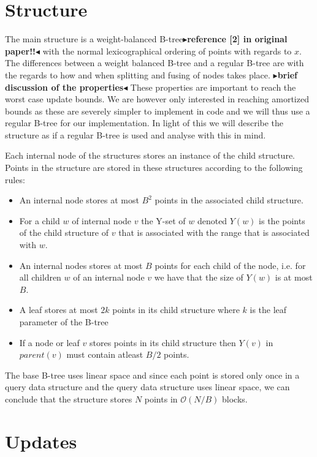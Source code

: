 \documentclass[twoside,11pt,openright]{report}
\newcommand{\todo}[1]{{\color[rgb]{.5,0,0}\textbf{$\blacktriangleright$#1$\blacktriangleleft$}}}
\begin{document}
\section{Structure}
The main structure is a weight-balanced B-tree\todo{reference [2] in original paper!!} with the normal lexicographical ordering of points with regards to $x$. The differences between a weight balanced B-tree and a regular B-tree are with the regards to how and when splitting and fusing of nodes takes place. \todo{brief discussion of the properties} These properties are important to reach the worst case update bounds. We are however only interested in reaching amortized bounds as these are severely simpler to implement in code and we will thus use a regular B-tree for our implementation. In light of this we will describe the structure as if a regular B-tree is used and analyse with this in mind.

Each internal node of the structures stores an instance of the child structure. Points in the structure are stored in these structures according to the following rules:
\begin{itemize}
	\item{An internal node stores at most $B^2$ points in the associated child structure.}
	\item{For a child $w$ of internal node $v$ the Y-set of $w$ denoted $Y(w)$ is the points of the child structure of $v$ that is associated with the range that is associated with $w$.}
	\item{An internal nodes stores at most $B$ points for each child of the node, i.e. for all children $w$ of an internal node $v$ we have that the size of $Y(w)$ is at most $B$.}
	\item{A leaf stores at most $2k$ points in its child structure where $k$ is the leaf parameter of the B-tree}
	\item{If a node or leaf $v$ stores points in its child structure then $Y(v)$ in $parent(v)$ must contain atleast $B/2$ points.}
\end{itemize}

The base B-tree uses linear space and since each point is stored only once in a query data structure and the query data structure uses linear space, we can conclude that the structure stores $N$ points in $\mathcal{O}(N/B)$ blocks.

\section{Updates}
\label{sec:arge_updates}
\end{document}
